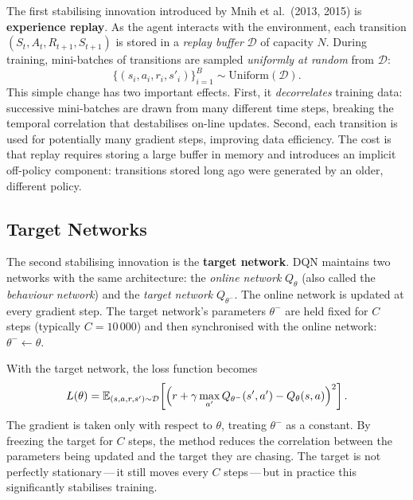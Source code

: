 The first stabilising innovation introduced by Mnih et al.~(2013, 2015) is
\textbf{experience replay}.  As the agent interacts with the environment,
each transition $(S_t, A_t, R_{t+1}, S_{t+1})$ is stored in a \emph{replay buffer}
$\mathcal{D}$ of capacity $N$.  During training, mini-batches of transitions are sampled
\emph{uniformly at random} from $\mathcal{D}$:
\begin{equation}
\label{eq:replay-sampling}
\{(s_i, a_i, r_i, s'_i)\}_{i=1}^B \sim \mathrm{Uniform}(\mathcal{D}).
\end{equation}
This simple change has two important effects.  First, it \emph{decorrelates} training data:
successive mini-batches are drawn from many different time steps, breaking the temporal
correlation that destabilises on-line updates.  Second, each transition is used for potentially
many gradient steps, improving data efficiency.  The cost is that replay requires storing a large
buffer in memory and introduces an implicit off-policy component: transitions stored long ago were
generated by an older, different policy.

\subsection{Target Networks}
\label{subsec:target-networks}

The second stabilising innovation is the \textbf{target network}.  DQN
maintains two networks with the same architecture: the \emph{online network} $Q_\theta$ (also
called the \emph{behaviour network}) and the \emph{target network} $Q_{\theta^-}$.  The online
network is updated at every gradient step.  The target network's parameters $\theta^-$ are held
fixed for $C$ steps (typically $C = 10\,000$) and then synchronised with the online network:
$\theta^- \leftarrow \theta$.

With the target network, the loss function becomes
\begin{equation}
\label{eq:dqn-loss}
L(\theta) = \operatorname{\mathbb{E}}_{(s,a,r,s') \sim \mathcal{D}}\!\left[
\Bigl(r + \gamma \max_{a'} Q_{\theta^-}(s', a') - Q_\theta(s, a)\Bigr)^2
\right].
\end{equation}
The gradient is taken only with respect to $\theta$, treating $\theta^-$ as a constant.  By
freezing the target for $C$ steps, the method reduces the correlation between the parameters
being updated and the target they are chasing.  The target is not perfectly stationary\,---\,it
still moves every $C$ steps\,---\,but in practice this significantly stabilises training.


